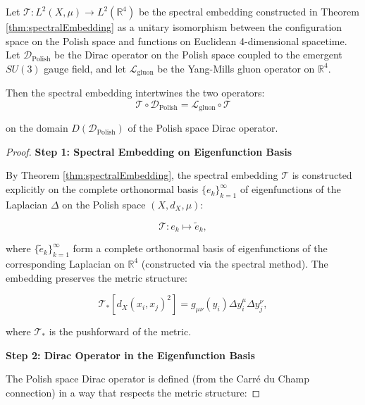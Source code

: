 \begin{theorem}
\label{thm:spectralEmbeddingIntertwinesDiracGluon}

Let $\mathcal{T}: L^2(X, \mu) \to L^2(\mathbb{R}^4)$ be the spectral embedding constructed in Theorem \ref{thm:spectralEmbedding} as a unitary isomorphism between the configuration space on the Polish space and functions on Euclidean 4-dimensional spacetime. Let $\mathcal{D}_{\mathrm{Polish}}$ be the Dirac operator on the Polish space coupled to the emergent $SU(3)$ gauge field, and let $\mathcal{L}_{\mathrm{gluon}}$ be the Yang-Mills gluon operator on $\mathbb{R}^4$.

Then the spectral embedding intertwines the two operators:
\begin{equation}
\mathcal{T} \circ \mathcal{D}_{\mathrm{Polish}} = \mathcal{L}_{\mathrm{gluon}} \circ \mathcal{T}
\label{eq:spectralIntertwining}
\end{equation}

on the domain $D(\mathcal{D}_{\mathrm{Polish}})$ of the Polish space Dirac operator.

\begin{proof}

\textbf{Step 1: Spectral Embedding on Eigenfunction Basis}

By Theorem \ref{thm:spectralEmbedding}, the spectral embedding $\mathcal{T}$ is constructed explicitly on the complete orthonormal basis $\{e_k\}_{k=1}^{\infty}$ of eigenfunctions of the Laplacian $\Delta$ on the Polish space $(X, d_X, \mu)$:

\begin{equation}
\mathcal{T}: e_k \mapsto \tilde{e}_k,
\end{equation}

where $\{\tilde{e}_k\}_{k=1}^{\infty}$ form a complete orthonormal basis of eigenfunctions of the corresponding Laplacian on $\mathbb{R}^4$ (constructed via the spectral method). The embedding preserves the metric structure:

\begin{equation}
\mathcal{T}_* [d_X(x_i, x_j)^2] = g_{\mu\nu}(y_i) \Delta y^\mu_i \Delta y^\nu_j,
\end{equation}

where $\mathcal{T}_*$ is the pushforward of the metric.

\textbf{Step 2: Dirac Operator in the Eigenfunction Basis}

The Polish space Dirac operator is defined (from the Carré du Champ connection) in a way that respects the metric structure:


\end{proof}
\end{theorem}
